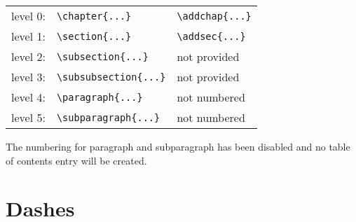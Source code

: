 \begin{center}
  \begin{tabular}{lll}
    level 0: & \verb|\chapter{...}|       & \verb*|\addchap{...}| \\
    level 1: & \verb|\section{...}|       & \verb*|\addsec{...}| \\
    level 2: & \verb|\subsection{...}|    & not provided \\
    level 3: & \verb|\subsubsection{...}| & not provided \\
    level 4: & \verb|\paragraph{...}|     & not numbered \\
    level 5: & \verb|\subparagraph{...}|  & not numbered
  \end{tabular}
\end{center}

The numbering for paragraph and subparagraph has been disabled and no table of contents entry will be created.

\section{Dashes}


